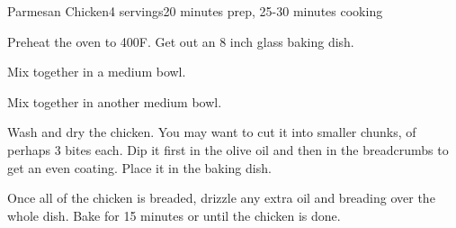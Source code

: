 \documentclass[../Cookbook.tex]{subfiles}
\begin{document}
\begin{recipe}{Parmesan Chicken}{4 servings}{20 minutes prep, 25-30 minutes cooking}

Preheat the oven to 400\0F. Get out an 8 inch glass baking dish.

Mix together in a medium bowl.

Mix together in another medium bowl.

Wash and dry the chicken. You may want to cut it into smaller chunks, of perhaps 3 bites each. Dip it first in the olive oil and then in the breadcrumbs to get an even coating. Place it in the baking dish.

\newstep
Once all of the chicken is breaded, drizzle any extra oil and breading over the whole dish.
Bake for 15 minutes or until the chicken is done.


\end{recipe}
\end{document}

